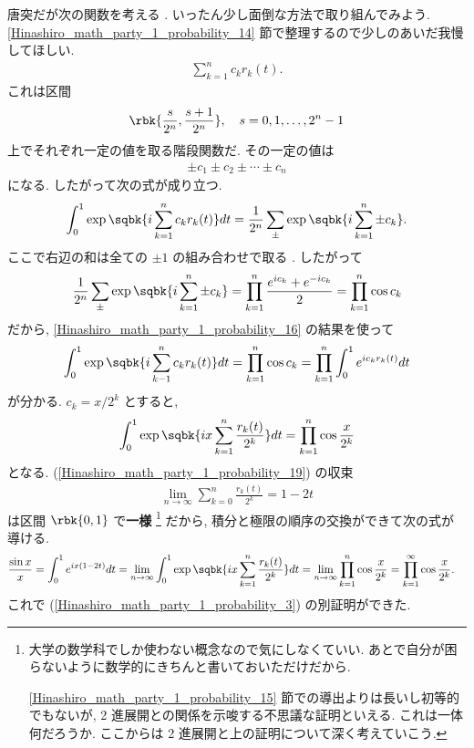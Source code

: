 \documentclass[openany, a4paper, oneside]{jsbook}
\begin{document}
唐突だが次の関数を考える \footnotemark[54]{}.
いったん少し面倒な方法で取り組んでみよう.
\ref{Hinashiro_math_party_1_probability_14} 節で整理するので少しのあいだ我慢してほしい.
\begin{align}
 \sum_{k=1}^{n} c_k r_k (t).
\end{align}
これは区間
\begin{align}
 \rbk{\frac{s}{2^n}, \frac{s+1}{2^n}}, \quad s=0,1, \dots, 2^n -1
\end{align}
上でそれぞれ一定の値を取る階段関数だ.
その一定の値は
\begin{align}
 \pm c_1 \pm c_2 \pm \cdots \pm c_n
\end{align}
になる.
したがって次の式が成り立つ.
\begin{align}
 \int_0^1 \exp \sqbk{i \sum_{k=1}^{n} c_k r_k (t)} dt
 =
 \frac{1}{2^n} \sum_{\pm} \exp \sqbk{ i \sum_{k=1}^n \pm c_k}.
\end{align}
ここで右辺の和は全ての $\pm 1$ の組み合わせで取る \footnotemark[55]{}.
したがって
\begin{align}
 \frac{1}{2^n} \sum_{\pm} \exp \sqbk{ i \sum_{k=1}^n \pm c_k}
 =
 \prod_{k=1}^{n} \frac{e^{ic_k} + e^{-ic_k}}{2}
 =
 \prod_{k=1}^{n} \cos c_k
\end{align}
だから, \ref{Hinashiro_math_party_1_probability_16} の結果を使って
\begin{align}
 \int_0^1 \exp \sqbk{i \sum_{k-1}^n c_k r_k (t)} dt
 =
 \prod_{k=1}^n \cos c_k
 =
 \prod_{k=1}^n \int_0^1 e^{i c_k r_k (t)} dt \label{Hinashiro_math_party_1_probability_6}
\end{align}
が分かる.
$c_k = x / 2^k$ とすると,
\begin{align}
 \int_0^1 \exp \sqbk{ix \sum_{k=1}^n \frac{r_k (t)}{2^k}} dt
 =
 \prod_{k=1}^n \cos \frac{x}{2^k}
\end{align}
となる.
(\ref{Hinashiro_math_party_1_probability_19}) の収束
\begin{align}
 \lim_{n \to \infty} \sum_{k=0}^n \frac{r_k (t)}{2^k}
 =
 1 - 2 t
\end{align}
は区間 $\rbk{0,1}$ で\textbf{一様} \footnote{大学の数学科でしか使わない概念なので気にしなくていい. あとで自分が困らないように数学的にきちんと書いておいただけだから.

\ref{Hinashiro_math_party_1_probability_15} 節での導出よりは長いし初等的でもないが, 2 進展開との関係を示唆する不思議な証明といえる.
これは一体何だろうか.
ここからは 2 進展開と上の証明について深く考えていこう.} だから,
積分と極限の順序の交換ができて次の式が導ける.
\begin{align}
 \frac{\sin x}{x}
 &=
 \int_0^1 e^{ix (1 - 2t)} dt
 =
 \lim_{n \to \infty} \int_0^1 \exp \sqbk{ix \sum_{k=1}^n \frac{r_k (t)}{2^k}} dt
 =
 \lim_{n \to \infty} \prod_{k=1}^n \cos \frac{x}{2^k}
 =
 \prod_{k=1}^{\infty} \cos \frac{x}{2^k}.
\end{align}
これで (\ref{Hinashiro_math_party_1_probability_3}) の別証明ができた.
\end{document}
